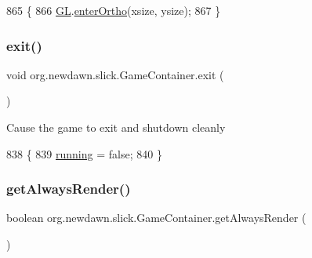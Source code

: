 \begin{DoxyCode}
865                                                     \{
866         \mbox{\hyperlink{classorg_1_1newdawn_1_1slick_1_1_game_container_a38d69b28b32e0b7e99555b8ae6061289}{GL}}.\mbox{\hyperlink{interfaceorg_1_1newdawn_1_1slick_1_1opengl_1_1renderer_1_1_s_g_l_a703b23e860de8e89ed9380d598a8a4bc}{enterOrtho}}(xsize, ysize);
867     \}
\end{DoxyCode}
\mbox{\label{classorg_1_1newdawn_1_1slick_1_1_game_container_a6d888463695fe3aac4123e72ac14480f}} 
\subsubsection{\texorpdfstring{exit()}{exit()}}
{\footnotesize\ttfamily void org.\+newdawn.\+slick.\+Game\+Container.\+exit (\begin{DoxyParamCaption}{ }\end{DoxyParamCaption})\hspace{0.3cm}{\ttfamily [inline]}}

Cause the game to exit and shutdown cleanly 
\begin{DoxyCode}
838                        \{
839         \mbox{\hyperlink{classorg_1_1newdawn_1_1slick_1_1_game_container_a5cb10a093281abb5b6ee60f2b18c26c3}{running}} = \textcolor{keyword}{false};
840     \}
\end{DoxyCode}
\mbox{\label{classorg_1_1newdawn_1_1slick_1_1_game_container_a75eb45ef137c72ed44c4758c80b49f0e}} 
\subsubsection{\texorpdfstring{get\+Always\+Render()}{getAlwaysRender()}}
{\footnotesize\ttfamily boolean org.\+newdawn.\+slick.\+Game\+Container.\+get\+Always\+Render (\begin{DoxyParamCaption}{ }\end{DoxyParamCaption})\hspace{0.3cm}{\ttfamily [inline]}}

